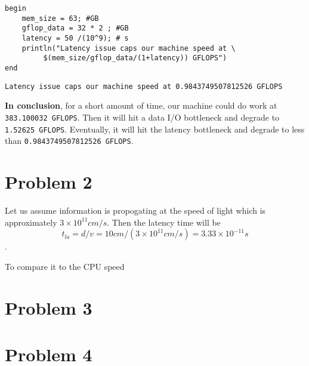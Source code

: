 \documentclass[11pt]{article}
\begin{document}
\begin{verbatim}
begin
    mem_size = 63; #GB
    gflop_data = 32 * 2 ; #GB
    latency = 50 /(10^9); # s
    println("Latency issue caps our machine speed at \
         $(mem_size/gflop_data/(1+latency)) GFLOPS")
end
\end{verbatim}

\begin{verbatim}
Latency issue caps our machine speed at 0.9843749507812526 GFLOPS
\end{verbatim}



\textbf{In conclusion}, for a short amount of time, our machine could do work at
\texttt{383.100032 GFLOPS}. Then it will hit a data I/O bottleneck and degrade to
\texttt{1.52625 GFLOPS}. Eventually, it will hit the latency bottleneck and degrade to
less than \texttt{0.9843749507812526 GFLOPS}.

\section{Problem 2}
\label{sec:org21def95}
Let us assume information is propogating at the speed of light which is
approximately \(3 \times 10^{11} cm/s\). Then the latency time will be \[ t_{la}
= d / v = 10 cm / (3 \times 10^{11} cm / s) = 3.33 \times 10^{-11} s\].

To compare it to the CPU speed
\section{Problem 3}
\label{sec:org7dc171d}

\section{Problem 4}
\label{sec:orgbe57195}
\end{document}

